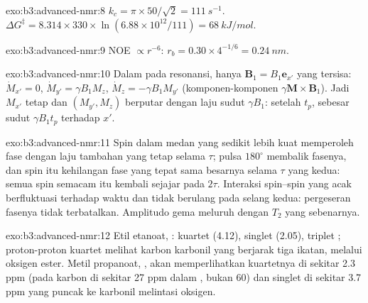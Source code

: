 \begin{solution}{exo:b3:advanced-nmr:8}
$k_c = \pi \times 50/\sqrt2 = \qty{111}{s^{-1}}$. $\Delta G^\ddagger = 8.314 \times 330 \times
\ln(6.88\times10^{12}/111) = \qty{68}{kJ/mol}$.
\end{solution}

\begin{solution}{exo:b3:advanced-nmr:9}
NOE $\propto r^{-6}$: $r_b = 0.30 \times 4^{-1/6} = \qty{0.24}{nm}$.
\end{solution}

\begin{solution}{exo:b3:advanced-nmr:10}
Dalam  pada resonansi, hanya $\mathbf B_1 = B_1\mathbf e_{x'}$ yang
tersisa: $\dot M_{x'} = 0$, $\dot M_{y'} = \gamma B_1M_z$, $\dot M_z = -\gamma B_1M_{y'}$
(komponen-komponen $\gamma\mathbf M\times\mathbf B_1$). Jadi $M_{x'}$ tetap dan
$(M_{y'}, M_z)$ berputar dengan laju sudut $\gamma B_1$: setelah $t_p$, sebesar
sudut $\gamma B_1t_p$ terhadap $x'$.
\end{solution}

\begin{solution}{exo:b3:advanced-nmr:11}
Spin dalam medan yang sedikit lebih kuat memperoleh fase dengan laju tambahan
yang tetap selama $\tau$; pulsa $180^\circ$ membalik fasenya, dan spin itu
kehilangan fase yang tepat sama besarnya selama $\tau$ yang kedua: semua spin
semacam itu kembali sejajar pada $2\tau$. Interaksi spin--spin yang acak
berfluktuasi terhadap waktu dan tidak berulang pada selang kedua: pergeseran
fasenya tidak terbatalkan. Amplitudo gema meluruh dengan $T_2$ yang
sebenarnya.
\end{solution}

\begin{solution}{exo:b3:advanced-nmr:12}
Etil etanoat, : kuartet  (4.12), singlet 
(2.05), triplet ; proton-proton kuartet melihat karbon karbonil yang
berjarak tiga ikatan, melalui oksigen ester. Metil propanoat, ,
akan memperlihatkan kuartetnya di sekitar 2.3 ppm (pada karbon di sekitar
27 ppm dalam , bukan 60) dan singlet  di sekitar 3.7 ppm yang
puncak  ke karbonil melintasi oksigen.
\end{solution}

